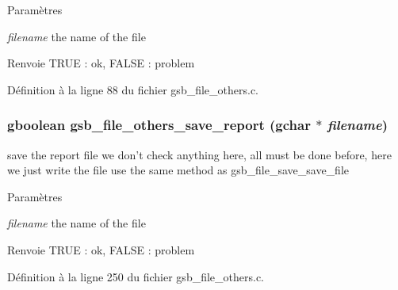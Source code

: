 \begin{DoxyParams}{Paramètres}
\item[{\em filename}]the name of the file\end{DoxyParams}
\begin{DoxyReturn}{Renvoie}
TRUE : ok, FALSE : problem 
\end{DoxyReturn}


Définition à la ligne 88 du fichier gsb\_\-file\_\-others.c.

\subsubsection[{gsb\_\-file\_\-others\_\-save\_\-report}]{\setlength{\rightskip}{0pt plus 5cm}gboolean gsb\_\-file\_\-others\_\-save\_\-report (gchar $\ast$ {\em filename})}\label{gsb__file__others_8h_a1c440737d473de4c6100fef0d770139f}
save the report file we don't check anything here, all must be done before, here we just write the file use the same method as gsb\_\-file\_\-save\_\-save\_\-file


\begin{DoxyParams}{Paramètres}
\item[{\em filename}]the name of the file\end{DoxyParams}
\begin{DoxyReturn}{Renvoie}
TRUE : ok, FALSE : problem 
\end{DoxyReturn}


Définition à la ligne 250 du fichier gsb\_\-file\_\-others.c.

